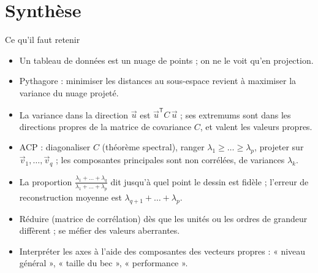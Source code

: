 \section{Synthèse}

\begin{frame}{Ce qu'il faut retenir}
  \small
  \begin{itemize}
    \item Un tableau de données est un nuage de points ; on ne le voit
      qu'en projection.
    \item Pythagore : minimiser les distances au sous-espace revient à
      maximiser la variance du nuage projeté.
    \item La variance dans la direction $\vec u$ est $\vec u^{\mathsf T}C\,\vec u$ ;
      ses extremums sont dans les directions propres de la matrice de
      covariance $C$, et valent les valeurs propres.
    \item ACP : diagonaliser $C$ (théorème spectral), ranger
      $\lambda_1\geq\dots\geq\lambda_p$, projeter sur
      $\vec v_1,\dots,\vec v_q$ ; les composantes principales sont non
      corrélées, de variances $\lambda_k$.
    \item La proportion $\frac{\lambda_1+\dots+\lambda_q}{\lambda_1+\dots+\lambda_p}$
      dit jusqu'à quel point le dessin est fidèle ; l'erreur de
      reconstruction moyenne est $\lambda_{q+1}+\dots+\lambda_p$.
    \item Réduire (matrice de corrélation) dès que les unités ou les
      ordres de grandeur diffèrent ; se méfier des valeurs aberrantes.
    \item Interpréter les axes à l'aide des composantes des vecteurs
      propres : « niveau général », « taille du bec », « performance ».
  \end{itemize}
\end{frame}

